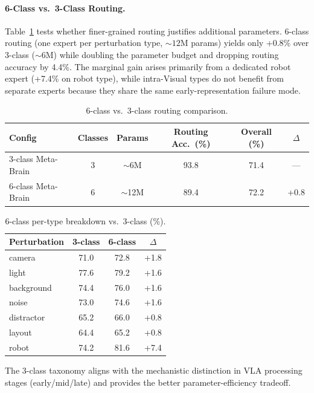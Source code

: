 \documentclass[letterpaper]{article}
\begin{document}
\paragraph{6-Class vs.\ 3-Class Routing.}
Table~\ref{tab:granularity} tests whether finer-grained routing justifies additional parameters.
6-class routing (one expert per perturbation type, ${\sim}12$M params) yields only +0.8\% over 3-class (${\sim}6$M) while doubling the parameter budget and dropping routing accuracy by 4.4\%.
The marginal gain arises primarily from a dedicated robot expert (+7.4\% on robot type), while intra-Visual types do not benefit from separate experts because they share the same early-representation failure mode.

\begin{table}[h]
\centering
\caption{6-class vs.\ 3-class routing comparison.}
\label{tab:granularity}
\small
\begin{tabular}{lccccc}
\toprule
Config & Classes & Params & Routing Acc.\ (\%) & Overall (\%) & $\Delta$ \\
\midrule
3-class Meta-Brain & 3 & ${\sim}$6M  & 93.8 & 71.4 & --- \\
6-class Meta-Brain & 6 & ${\sim}$12M & 89.4 & 72.2 & +0.8 \\
\bottomrule
\end{tabular}
\end{table}

\begin{table}[h]
\centering
\caption{6-class per-type breakdown vs.\ 3-class (\%).}
\label{tab:6class-detail}
\small
\begin{tabular}{lccc}
\toprule
Perturbation & 3-class & 6-class & $\Delta$ \\
\midrule
camera     & 71.0 & 72.8 & +1.8 \\
light      & 77.6 & 79.2 & +1.6 \\
background & 74.4 & 76.0 & +1.6 \\
noise      & 73.0 & 74.6 & +1.6 \\
distractor & 65.2 & 66.0 & +0.8 \\
layout     & 64.4 & 65.2 & +0.8 \\
robot      & 74.2 & 81.6 & +7.4 \\
\bottomrule
\end{tabular}
\end{table}

The 3-class taxonomy aligns with the mechanistic distinction in VLA processing stages (early/mid/late) and provides the better parameter-efficiency tradeoff.
\end{document}
